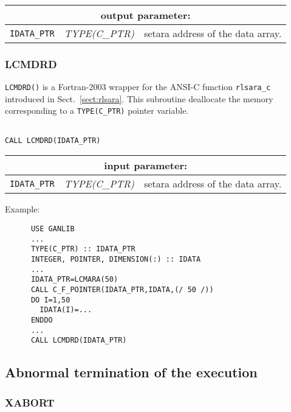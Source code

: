 \vskip 0.8cm

\noindent
\begin{tabular}{|p{1.5cm}|p{3cm}|p{10cm}|}
\hline
\multicolumn{3}{|c|}{\bf output parameter:} \\
\hline
{\tt IDATA\_PTR} & {\it TYPE(C\_PTR)} & setara address of the data array. \\
\hline
\end{tabular}

\subsubsection{LCMDRD}\label{sect:LCMDRD}

{\tt LCMDRD()} is a Fortran-2003 wrapper for the ANSI-C function {\tt rlsara\_c} introduced in Sect.~\ref{sect:rlsara}. This subroutine
deallocate the memory corresponding to a {\tt TYPE(C\_PTR)} pointer variable.

\begin{verbatim}

CALL LCMDRD(IDATA_PTR)
\end{verbatim}

\noindent
\begin{tabular}{|p{1.5cm}|p{3cm}|p{10cm}|}
\hline
\multicolumn{3}{|c|}{\bf input parameter:} \\
\hline
{\tt IDATA\_PTR} & {\it TYPE(C\_PTR)} & setara address of the data array. \\
\hline
\end{tabular}

\vskip 0.4cm

\noindent Example:
\begin{verbatim}
      USE GANLIB
      ...
      TYPE(C_PTR) :: IDATA_PTR
      INTEGER, POINTER, DIMENSION(:) :: IDATA
      ...
      IDATA_PTR=LCMARA(50)
      CALL C_F_POINTER(IDATA_PTR,IDATA,(/ 50 /))
      DO I=1,50
        IDATA(I)=...
      ENDDO
      ...
      CALL LCMDRD(IDATA_PTR)
\end{verbatim}

\vskip 0.8cm

\subsection{Abnormal termination of the execution}

\subsubsection{XABORT}

